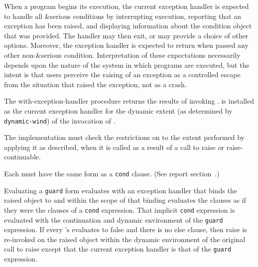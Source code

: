 When a program begins its execution, the current
exception handler is expected to handle all {\cf\&serious}
conditions by interrupting execution, reporting that an
exception has been raised, and displaying information
about the condition object that was provided.  The handler
may then exit, or may provide a choice of other options.
Moreover, the exception handler is expected to return when
passed any other non-{\cf\&serious} condition.
Interpretation of these expectations necessarily depends
upon the nature of the system in which programs are executed,
but the intent is that users perceive the raising of an
exception as a controlled escape from the situation that
raised the exception, not as a crash.

\begin{entry}{%
}

  The {\cf
with-exception-handler} procedure returns the results of invoking
.   is installed as the current
exception handler for the dynamic extent (as determined by {\tt
  dynamic-wind}) of the invocation of .

\implresp The implementation must check the restrictions on
 to the extent performed by applying it as described,
when it is called as a result of a call to {\cf raise} or {\cf
  raise-continuable}.
\end{entry}

\begin{entry}{%
}

\syntax
Each  must have the same form as a {\tt cond} clause.
(See report section~.)

\semantics 
Evaluating a {\tt guard} form evaluates  with an exception
handler that binds the raised object to  and within the scope of
that binding evaluates the clauses as if they were the clauses of a
{\tt cond} expression. That implicit {\tt cond} expression is evaluated with the
continuation and dynamic environment of the {\tt guard} expression. If every
's  evaluates to false and there is no else clause, then
{\cf raise} is re-invoked on the raised object within the dynamic
environment of the original call to raise except that the current
exception handler is that of the {\tt guard} expression.  
\end{entry}

